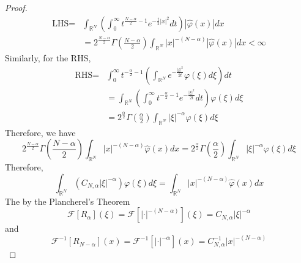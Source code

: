 \begin{proof}
\begin{equation*}
		\begin{aligned}
			\text{LHS} = & \int_{\mathbb{R}^N}\left(\int_0^{\infty} t^{\frac{N-\alpha}{2}-1} e^{-\frac{t}{2}|x|^2} d t\right)|\widehat{\varphi}(x)| d x \\
			& =2^{\frac{N-\alpha}{2}} \Gamma\left(\frac{N-\alpha}{2}\right) \int_{\mathbb{R}^N}|x|^{-(N-\alpha)}|\widehat{\varphi}(x)| d x<\infty
		\end{aligned}
	\end{equation*}
	Similarly, for the RHS,
	\begin{equation*}
		\begin{aligned}
			\text{RHS}=& \int_0^{\infty} t^{-\frac{\alpha}{2}-1}\left(\int_{\mathbb{R}^N} e^{-\frac{|\xi|^2}{2 t}} \varphi(\xi) d \xi\right) d t \\
			& =\int_{\mathbb{R}^N}\left(\int_0^{\infty} t^{-\frac{\alpha}{2}-1} e^{-\frac{|\xi|^2}{2 t}} d t\right) \varphi(\xi) d \xi \\
			& =2^{\frac{\alpha}{2}} \Gamma\left(\frac{\alpha}{2}\right) \int_{\mathbb{R}^N}|\xi|^{-\alpha} \varphi(\xi) d \xi
		\end{aligned}
	\end{equation*}
	Therefore, we have
	\begin{equation*}
		2^{\frac{N-\alpha}{2}} \Gamma\left(\frac{N-\alpha}{2}\right) \int_{\mathbb{R}^N}|x|^{-(N-\alpha)} \widehat{\varphi}(x) d x=2^{\frac{\alpha}{2}} \Gamma\left(\frac{\alpha}{2}\right) \int_{\mathbb{R}^N}|\xi|^{-\alpha} \varphi(\xi) d \xi
	\end{equation*}
	Therefore,
	\begin{equation*}
		\int_{\mathbb{R}^N}\left(C_{N, \alpha}|\xi|^{-\alpha}\right) \varphi(\xi) d \xi=\int_{\mathbb{R}^N}|x|^{-(N-\alpha)} \widehat{\varphi}(x) d x
	\end{equation*}
	The by the Plancherel's Theorem
	\begin{equation*}
		\mathcal{F}\left[R_\alpha\right](\xi)=\mathcal{F}\left[|\cdot|^{-(N-\alpha)}\right](\xi)=C_{N, \alpha}|\xi|^{-\alpha}
	\end{equation*}
	and
	\begin{equation*}
		\mathcal{F}^{-1}\left[R_{N-\alpha}\right](x)=\mathcal{F}^{-1}\left[|\cdot|^{-\alpha}\right](x)=C_{N, \alpha}^{-1}|x|^{-(N-\alpha)}
	\end{equation*}
\end{proof}

